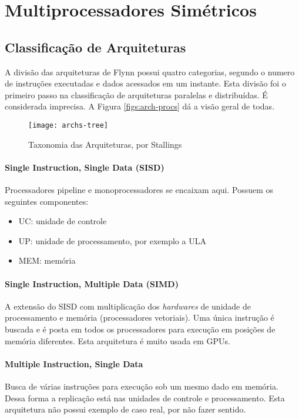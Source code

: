 \chapter{Multiprocessadores Simétricos}

\section{Classificação de Arquiteturas}

A divisão das arquiteturas de Flynn possui quatro categorias, segundo o numero de instruções executadas e dados acessados em um instante. Esta divisão foi o primeiro passo na classificação de arquiteturas paralelas e distribuídas. É considerada imprecisa. A Figura \ref{figs:arch-procs} dá a visão geral de todas.

\begin{figure}
  \centering
  \texttt{[image: archs-tree]}
  \caption{Taxonomia das Arquiteturas, por Stallings}
  \label{fig:archs-tree}
\end{figure}

\subsubsection{Single Instruction, Single Data (SISD)}
Processadores pipeline e monoprocessadores se encaixam aqui. Possuem os seguintes componentes:

\begin{itemize}
  \item UC: unidade de controle
  \item UP: unidade de processamento, por exemplo a ULA
  \item MEM: memória
\end{itemize}

\subsubsection{Single Instruction, Multiple Data (SIMD)}
A extensão do SISD com multiplicação dos \textit{hardwares} de unidade de processamento e memória (processadores vetoriais). Uma única instrução é buscada e é posta em todos os processadores para execução em posições de memória diferentes. Esta arquitetura é muito usada em GPUs.

\subsubsection{Multiple Instruction, Single Data}
Busca de várias instruções para execução sob um mesmo dado em memória. Dessa forma a replicação está nas unidades de controle e processamento. Esta arquitetura não possui exemplo de caso real, por não fazer sentido.

